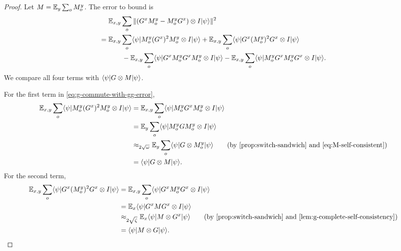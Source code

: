 \begin{proof}
	\leanok
	Let $M = \mathbb{E}_y \sum_o M_o^y$. The error to bound is
	\begin{align}
		    & \mathbb{E}_{x,y} \sum_o \|(G^xM_o^y - M_o^yG^x)\otimes I \lvert \psi \rangle\|^2 \nonumber \\
		={} & \mathbb{E}_{x,y} \sum_o \langle \psi \rvert M_o^y (G^x)^2 M_o^y \otimes I \lvert \psi \rangle
		+ \mathbb{E}_{x,y} \sum_o \langle \psi \rvert G^x (M_o^y)^2 G^x \otimes I \lvert \psi \rangle \nonumber   \\
		    & \qquad
		- \mathbb{E}_{x,y} \sum_o \langle \psi \rvert G^x M_o^y G^x M_o^y \otimes I \lvert \psi \rangle
		- \mathbb{E}_{x,y} \sum_o \langle \psi \rvert M_o^y G^x M_o^y G^x \otimes I \lvert \psi \rangle.
		\label{eq:g-commute-with-gg-error}
	\end{align}
	We compare all four terms with $\langle \psi \rvert G \otimes M \lvert \psi \rangle$.

	For the first term in \ref{eq:g-commute-with-gg-error},
	\begin{align*}
		\E_{x,y} \sum_o \bra{\psi} M_o^y (G^x)^2 M_o^y \ot I \ket{\psi}
		 & =
		\E_{x,y} \sum_o \bra{\psi} M_o^y G^x M_o^y \ot I \ket{\psi}               \\
		 & =
		\E_y \sum_o \bra{\psi} M_o^y G M_o^y \ot I \ket{\psi}                     \\
		 & \approx_{2\sqrt{\omega}} \E_y \sum_o \bra{\psi} G \ot M_o^y \ket{\psi}
		\tag{by \ref{prop:switch-sandwich} and \ref{eq:M-self-consistent}}        \\
		 & =
		\bra{\psi} G \ot M \ket{\psi}.
	\end{align*}
	For the second term,
	\begin{align*}
		\E_{x,y} \sum_o \bra{\psi} G^x (M_o^y)^2 G^x \ot I \ket{\psi}
		 & =
		\E_{x,y} \sum_o \bra{\psi} G^x M_o^y G^x \ot I \ket{\psi}                     \\
		 & =
		\E_x \bra{\psi} G^x M G^x \ot I \ket{\psi}                                    \\
		 & \approx_{2\sqrt{\zeta}} \E_x \bra{\psi} M \ot G^x \ket{\psi}
		\tag{by \ref{prop:switch-sandwich} and \ref{lem:g-complete-self-consistency}} \\
		 & =
		\bra{\psi} M \ot G \ket{\psi}.
	\end{align*}


\end{proof}
